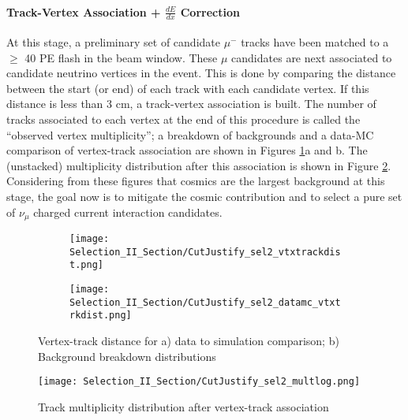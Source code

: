 \paragraph{Track-Vertex Association + $\frac{dE}{dx}$ Correction}
At this stage, a preliminary set of candidate $\mu^-$ tracks have been matched to a $\geq$ 40 PE flash in the beam window. These $\mu$ candidates are next associated to candidate neutrino vertices in the event. This is done by comparing the distance between the start (or end) of each track with each candidate vertex. If this distance is less than 3 cm, a track-vertex association is built.  The number of tracks associated to each vertex at the end of this procedure is called the ``observed vertex multiplicity''; a breakdown of backgrounds and a data-MC comparison of vertex-track association are shown in Figures \ref{fig:cutjust_sel2_vtxtrackdist}a and b.  The (unstacked) multiplicity distribution after this association is shown in Figure \ref{fig:cutjust_sel2_mult}. Considering from these figures that cosmics are the largest background at this stage, the goal now is to mitigate the cosmic contribution and to select a pure set of $\nu_{\mu}$ charged current interaction candidates.
\begin{figure}[h!]
  \begin{subfigure}[t]{0.4\textwidth}
\texttt{[image: Selection\_II\_Section/CutJustify\_sel2\_vtxtrackdist.png]}
    \caption{ }
  \end{subfigure} 
  \hspace{10 mm}
  \begin{subfigure}[t]{0.4\textwidth}
\texttt{[image: Selection\_II\_Section/CutJustify\_sel2\_datamc\_vtxtrkdist.png]}
    \caption{ }
  \end{subfigure} 
\caption{ Vertex-track distance for a) data to simulation comparison; b) Background breakdown distributions }
\label{fig:cutjust_sel2_vtxtrackdist}
\end{figure}

\begin{figure}[h!]
\centering
\texttt{[image: Selection\_II\_Section/CutJustify\_sel2\_multlog.png]}
    \caption{ }
\caption{ Track multiplicity distribution after vertex-track association }
\label{fig:cutjust_sel2_mult}
\end{figure}


